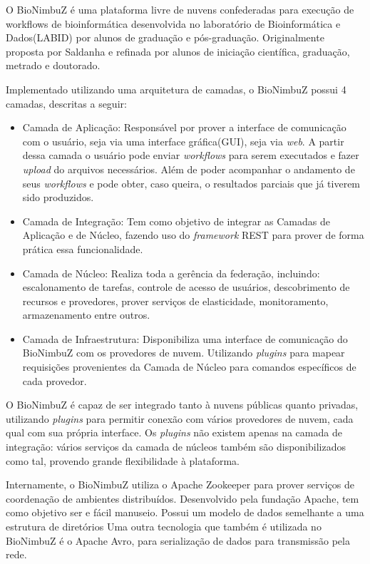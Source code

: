 O BioNimbuZ é uma plataforma livre de nuvens confederadas para execução de workflows de bioinformática desenvolvida no laboratório de Bioinformática e Dados(LABID) por alunos de graduação e pós-graduação. Originalmente proposta por Saldanha\cite{Saldanha_BioNimbus} e refinada por alunos de iniciação científica, graduação, metrado e doutorado.\cite{closer12_BioNimbuZ_AHP}\cite{BioNimbuZ_6846526} \cite{6732620_BioNimbuZ_ACOsched}\cite{BioNimbuZ_Breno_Deric}\cite{BioNimbuZ_Vegara}\cite{BioNimbuZ_Willian_C99}

Implementado utilizando uma arquitetura de camadas, o BioNimbuZ possui 4 camadas, descritas a seguir:
\begin{itemize}
	\item Camada de Aplicação: Responsável por prover a interface de comunicação com o usuário, seja via uma interface gráfica(GUI), seja via \textit{web}. A partir dessa camada o usuário pode enviar \textit{workflows} para serem executados e fazer \textit{upload} do arquivos necessários. Além de poder acompanhar o andamento de seus \textit{workflows} e pode obter, caso queira, o resultados parciais que já tiverem sido produzidos.
	
	\item Camada de Integração: Tem como objetivo de integrar as Camadas de Aplicação e de Núcleo, fazendo uso do \textit{framework} REST para prover de forma prática essa funcionalidade.
	
	\item Camada de Núcleo: Realiza toda a gerência da federação, incluindo: escalonamento de tarefas, controle de acesso de usuários, descobrimento de recursos e provedores, prover serviços de elasticidade, monitoramento, armazenamento entre outros.
	
	\item Camada de Infraestrutura: Disponibiliza uma interface de comunicação do BioNimbuZ com os provedores de nuvem. Utilizando \textit{plugins} para mapear requisições provenientes da Camada de Núcleo para comandos específicos de cada provedor.
\end{itemize}

O BioNimbuZ é capaz de ser integrado tanto à nuvens públicas quanto privadas, utilizando \textit{plugins} para permitir conexão com vários provedores de nuvem, cada qual com sua própria interface. Os \textit{plugins} não existem apenas na camada de integração: vários serviços da camada de núcleos também são disponibilizados como tal, provendo grande flexibilidade à plataforma.

Internamente, o BioNimbuZ utiliza o Apache Zookeeper\cite{Zookeeper} para prover serviços de coordenação de ambientes distribuídos. Desenvolvido pela fundação Apache\cite{Apache}, tem como objetivo ser e fácil manuseio. Possui um modelo de dados semelhante a uma estrutura de diretórios
Uma outra tecnologia que também é utilizada no BioNimbuZ é o Apache Avro\cite{Avro}, para serialização de dados para transmissão pela rede.
